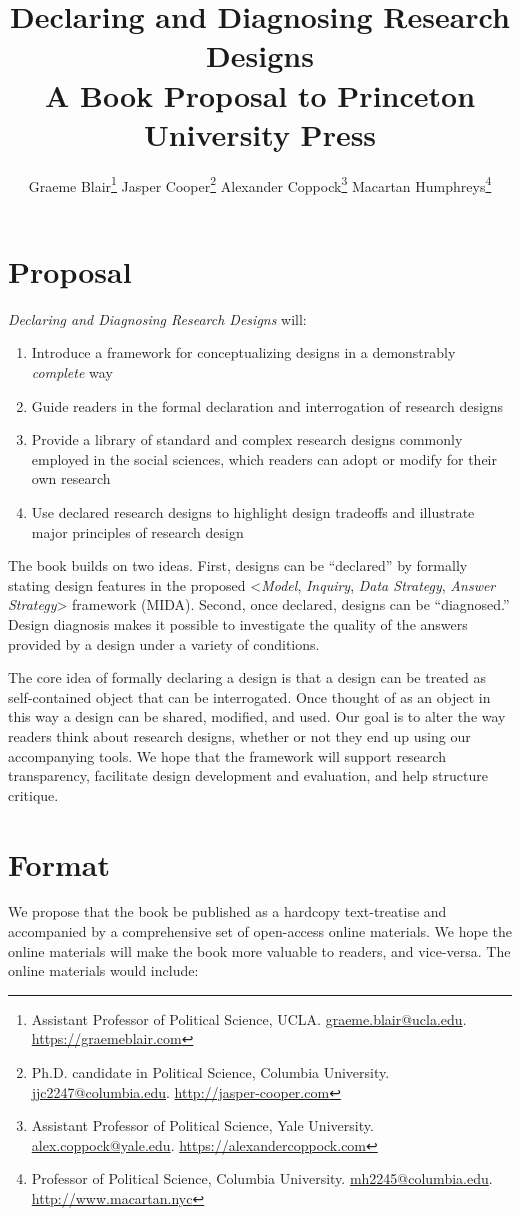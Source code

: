 \documentclass[11pt]{article}
\title{Declaring and Diagnosing Research Designs \\ {\normalsize A Book Proposal to Princeton University Press}}
\author{Graeme Blair\footnote{Assistant Professor of Political Science, UCLA. \href{mailto:graeme.blair@ucla.edu}{graeme.blair@ucla.edu}. \url{https://graemeblair.com}} \quad 
Jasper Cooper\footnote{Ph.D. candidate in Political Science, Columbia University. \href{mailto:jjc2247@columbia.edu}{jjc2247@columbia.edu}. \url{http://jasper-cooper.com}} \quad 
Alexander Coppock\footnote{Assistant Professor of Political Science, Yale University. \href{mailto:alex.coppock@yale.edu}{alex.coppock@yale.edu}. \url{https://alexandercoppock.com}} \quad 
\setcounter{footnote}{7}
Macartan Humphreys\footnote{Professor of Political Science, Columbia University. \href{mailto:mh2245@columbia.edu}{mh2245@columbia.edu}. \url{http://www.macartan.nyc}}   }
\begin{document}
\maketitle


\section{Proposal}

\noindent \textit{Declaring and Diagnosing Research Designs} will:
\begin{enumerate}
	\item Introduce a framework for conceptualizing designs in a demonstrably \textit{complete} way
	\item Guide readers in the formal declaration and interrogation of research designs
	\item Provide a library of standard and complex research designs commonly employed in the social sciences, which readers can adopt or modify for their own research
	\item Use declared research designs to highlight design tradeoffs and illustrate major principles of research design
\end{enumerate}

The book builds on two ideas. First, designs can be ``declared'' by formally stating design features in the proposed <\textit{Model}, \textit{Inquiry}, \textit{Data Strategy}, \textit{Answer Strategy}> framework (MIDA). Second, once declared, designs can be ``diagnosed.'' Design diagnosis makes it possible to investigate the quality of the answers provided by a design under a variety of conditions.   

The core idea of formally declaring a design is that a design can be treated as self-contained object that can be interrogated. Once thought of as an object in this way a design can be shared, modified, and used. Our goal is to alter the way readers think about research designs, whether or not they end up using our accompanying tools. We hope that the framework will support research transparency, facilitate design development and evaluation, and help structure critique. 

\section{Format}

We propose that the book be published as a hardcopy text-treatise and accompanied by a comprehensive set of open-access online materials. We hope the online materials will make the book more valuable to readers, and vice-versa. The online materials would include:
\end{document}
